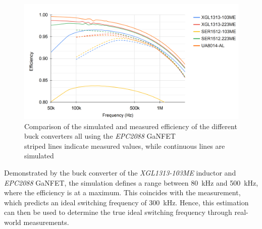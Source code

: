 \begin{figure}[H]
    \centering
    \includegraphics[width=1\linewidth]{Bilder/Kapitel4/Efficiency_Simulation_Comparison.png}
    \caption{Comparison of the simulated and measured efficiency of the different buck converters all using the \textit{EPC2088} \ac{GaNFET} \\striped lines indicate measured values, while continuous lines are simulated}
    \label{fig:efficiency_simuilation_comparison}
\end{figure}
Demonstrated by the buck converter of the \textit{XGL1313-103ME} inductor and \textit{EPC2088} \ac{GaNFET}, the simulation defines a range between \SI{80}{kHz} and \SI{500}{kHz}, where the efficiency is at a maximum. This coincides with the measurement, which predicts an ideal switching frequency of \SI{300}{kHz}. Hence, this estimation can then be used to determine the true ideal switching frequency through real-world measurements. 




